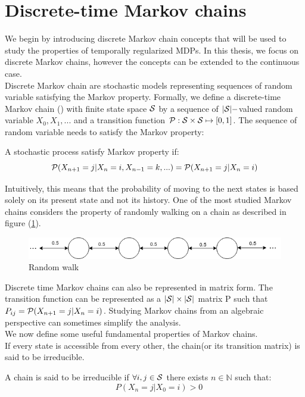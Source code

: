 \section{Discrete-time Markov chains}
We begin by introducing discrete Markov chain concepts that will be used to study the properties of temporally regularized MDPs. In this thesis, we focus on discrete Markov chains, however the concepts can be extended to the continuous case.\\ Discrete Markov chain are stochastic models representing sequences of random variable satisfying the Markov property. Formally, we define a discrete-time Markov chain (\cite{norris1998markov,levin2017markov,bremaud2013markov})  with finite state space $\mathcal{S}$ by a sequence of $|\mathcal{S}|-$valued random variable $X_0,X_1,..$. and a transition function $\mathcal{P} : \mathcal{S} \times \mathcal{S} \mapsto [0,1]$. The sequence of random variable needs to satisfy the Markov property:
\begin{definition}
A stochastic process satisfy Markov property if:
\begin{equation}
    \mathcal{P} (X_{n+1}=j|X_n = i,X_{n-1}=k,...) = \mathcal{P} (X_{n+1}=j|X_n = i)
\end{equation}
\end{definition}
Intuitively, this means that the probability of moving to the next states is based solely on its present state and not its history. One of the most studied Markov chains considers the property of randomly walking on a chain as described in figure (\ref{fig:random_walk}).\\
\begin{figure}
    \centering
    \includegraphics[scale=0.7]{fig/Markov_chain.png}
    \caption{Random walk}
    \label{fig:random_walk}
\end{figure}
Discrete time Markov chains can also be represented in matrix form. The transition function can be represented as a $|\mathcal{S}| \times |\mathcal{S}|$ matrix P such that $P_{ij} = \mathcal{P}(X_{n+1}=j|X_n=i)$. Studying Markov chains from an algebraic perspective can sometimes simplify the analysis.  \\
We now define some useful fundamental properties of Markov chains. \\
If every state is accessible from every other, the chain(or its transition matrix) is said to be irreducible. 
\begin{definition}
A chain is said to be irreducible if $\forall i,j \in \mathcal{S}$ there exists $n \in \mathbb{N}$ such that:
\begin{equation}
      \quad P(X_n = j|X_0=i) > 0
\end{equation}
\end{definition}
